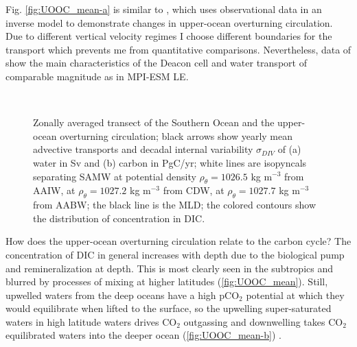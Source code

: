 {\color{RoyalBlue}Fig.} \ref{fig:UOOC_mean-a} is similar to \cite[fig. 1]{DeVries2017}, which uses observational data in an inverse model to demonstrate changes in upper-ocean overturning circulation. Due to different vertical velocity regimes I choose different boundaries for the transport which prevents me from quantitative comparisons. Nevertheless, data of \cite[fig. 1]{DeVries2017} show the main characteristics of the Deacon cell and water transport of comparable magnitude as in \acs{MPI-ESM LE}. \newline



\begin{figure}[h!]
        \myfloatalign
         \quad
         \\
        \caption{Zonally averaged transect of the Southern Ocean and the upper-ocean overturning circulation; black arrows show yearly mean advective transports and decadal internal variability $\sigma_{DIV}$ of (a) water in Sv and (b) carbon in PgC/yr; white lines are isopyncals separating \ac{SAMW} at potential density $\rho_{\theta\text{}}=1026.5$ kg m$^{-3}$ from \ac{AAIW}, at $\rho_{\theta\text{}}=1027.2$ kg m$^{-3}$ from \ac{CDW}, at $\rho_{\theta\text{}}=1027.7$ kg m$^{-3}$ from \ac{AABW}; the black line is the \ac{MLD}; the colored contours show the distribution of concentration in \acs{DIC}.} \label{fig:UOOC_mean}
\end{figure}



How does the upper-ocean overturning circulation relate to the carbon cycle? The concentration of \acs{DIC} in general increases with depth due to the biological pump and remineralization at depth. This is most clearly seen in the subtropics and blurred by processes of mixing at higher latitudes (\autoref{fig:UOOC_mean}). Still, upwelled waters from the deep oceans have a high pCO$_2$ potential at which they would equilibrate when lifted to the surface, so the upwelling super-saturated waters in high latitude waters drives CO$_2$ outgassing and downwelling takes CO$_2$ equilibrated waters into the deeper ocean (\autoref{fig:UOOC_mean-b}) \citep{Morrison2015}.\newline 

